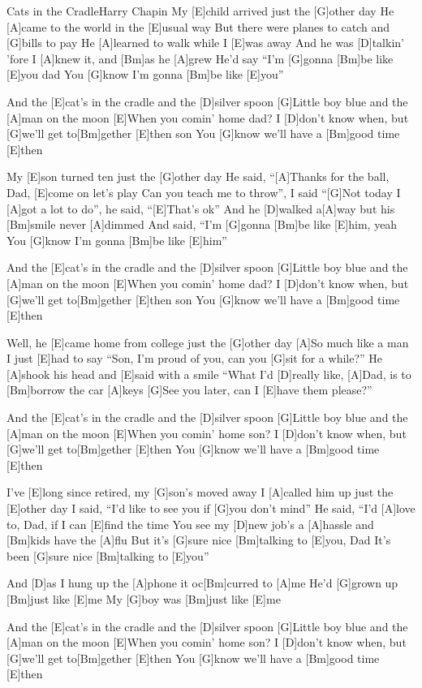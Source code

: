 \documentclass[../main.tex]{subfiles}
\begin{document}
\begin{song}[1]{Cats in the Cradle}{Harry Chapin}{}
My [E]child arrived just the [G]other day
He [A]came to the world in the [E]usual way
But there were planes to catch and [G]bills to pay
He [A]learned to walk while I [E]was away
And he was [D]talkin' 'fore I [A]knew it, and [Bm]as he [A]grew
He'd say ``I'm [G]gonna [Bm]be like [E]you dad
You [G]know I'm gonna [Bm]be like [E]you''

And the [E]cat's in the cradle and the [D]silver spoon
[G]Little boy blue and the [A]man on the moon
[E]When you comin' home dad?
I [D]don't know when, but [G]we'll get to[Bm]gether [E]then son
You [G]know we'll have a [Bm]good time [E]then

My [E]son turned ten just the [G]other day
He said, ``[A]Thanks for the ball, Dad, [E]come on let's play
Can you teach me to throw'', I said ``[G]Not today
I [A]got a lot to do'', he said, ``[E]That's ok''
And he [D]walked a[A]way but his [Bm]smile never [A]dimmed
And said, ``I'm [G]gonna [Bm]be like [E]him, yeah
You [G]know I'm gonna [Bm]be like [E]him''

And the [E]cat's in the cradle and the [D]silver spoon
[G]Little boy blue and the [A]man on the moon
[E]When you comin' home dad?
I [D]don't know when, but [G]we'll get to[Bm]gether [E]then son
You [G]know we'll have a [Bm]good time [E]then

Well, he [E]came home from college just the [G]other day
[A]So much like a man I just [E]had to say
``Son, I'm proud of you, can you [G]sit for a while?''
He [A]shook his head and [E]said with a smile
``What I'd [D]really like, [A]Dad, is to [Bm]borrow the car [A]keys
[G]See you later, can I [E]have them please?''

And the [E]cat's in the cradle and the [D]silver spoon
[G]Little boy blue and the [A]man on the moon
[E]When you comin' home son?
I [D]don't know when, but [G]we'll get to[Bm]gether [E]then
You [G]know we'll have a [Bm]good time [E]then\pagebreak

I've [E]long since retired, my [G]son's moved away
I [A]called him up just the [E]other day
I said, ``I'd like to see you if [G]you don't mind''
He said, ``I'd [A]love to, Dad, if I can [E]find the time
You see my [D]new job's a [A]hassle and [Bm]kids have the [A]flu
But it's [G]sure nice [Bm]talking to [E]you, Dad
It's been [G]sure nice [Bm]talking to [E]you''

And [D]as I hung up the [A]phone it oc[Bm]curred to [A]me
He'd [G]grown up [Bm]just like [E]me
My [G]boy was [Bm]just like [E]me

And the [E]cat's in the cradle and the [D]silver spoon
[G]Little boy blue and the [A]man on the moon
[E]When you comin' home son?
I [D]don't know when, but [G]we'll get to[Bm]gether [E]then
You [G]know we'll have a [Bm]good time [E]then

\end{song}
\end{document}
